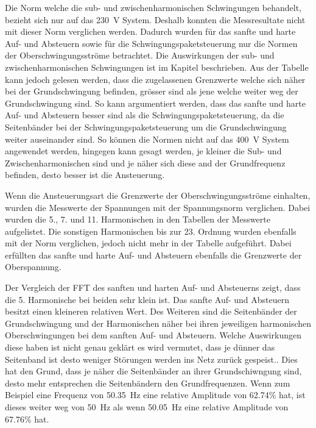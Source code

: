 Die Norm  welche die sub- und zwischenharmonischen Schwingungen behandelt, bezieht sich nur auf das \SI{230}{V} System. Deshalb konnten die Messresultate nicht mit dieser Norm verglichen werden. Dadurch wurden für das sanfte und harte Auf- und Absteuern sowie für die Schwingungspaketsteuerung nur die Normen der Oberschwingungsströme betrachtet. Die Auswirkungen der sub- und zwischenharmonischen Schwingungen ist im Kapitel  beschrieben. Aus der Tabelle  kann jedoch gelesen werden, dass die zugelassenen Grenzwerte welche sich näher bei der Grundschwingung befinden, grösser sind als jene welche weiter weg der Grundschwingung sind. So kann argumentiert werden, dass das sanfte und harte Auf- und Absteuern besser sind als die Schwingungspaketsteuerung, da die Seitenbänder bei der Schwingungspaketsteuerung um die Grundschwingung weiter auseinander sind. So können die Normen nicht auf das \SI{400}{V} System angewendet werden, hingegen kann gesagt werden, je kleiner die Sub- und Zwischenharmonischen sind und je näher sich diese and der Grundfrequenz befinden, desto besser ist die Ansteuerung.

Wenn die Ansteuerungsart die Grenzwerte der Oberschwingungsströme einhalten, wurden die Messwerte der Spannungen mit der Spannungsnorm  verglichen. Dabei wurden die 5., 7. und 11. Harmonischen in den Tabellen der Messwerte aufgelistet. Die sonstigen Harmonischen bis zur 23. Ordnung wurden ebenfalls mit der Norm verglichen, jedoch nicht mehr in der Tabelle aufgeführt. Dabei erfüllten das sanfte und harte Auf- und Absteuern ebenfalls die Grenzwerte der Oberspannung.

Der Vergleich der FFT des sanften und harten Auf- und Absteuerns zeigt, dass die 5. Harmonische bei beiden sehr klein ist. Das sanfte Auf- und Absteuern besitzt einen kleineren relativen Wert. Des Weiteren sind die Seitenbänder der Grundschwingung und der Harmonischen näher bei ihren jeweiligen harmonischen Oberschwingungen bei dem sanften Auf- und Absteuern. Welche Auswirkungen diese haben ist nicht genau geklärt es wird vermutet, dass je dünner das Seitenband ist desto weniger Störungen werden ins Netz zurück gespeist.. Dies hat den Grund, dass je näher die Seitenbänder an ihrer Grundschiwngung sind, desto mehr entsprechen die Seitenbändern den Grundfrequenzen. Wenn zum Beispiel eine Frequenz von \SI{50.35}{Hz} eine relative Amplitude von 62.74\% hat, ist dieses weiter weg von \SI{50}{Hz} als wenn \SI{50.05}{Hz} eine relative Amplitude von 67.76\% hat. 

